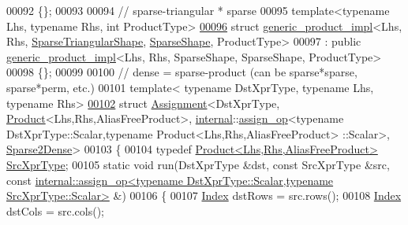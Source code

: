 \begin{DoxyCode}
00092 \{\};
00093 
00094 \textcolor{comment}{// sparse-triangular * sparse}
00095 \textcolor{keyword}{template}<\textcolor{keyword}{typename} Lhs, \textcolor{keyword}{typename} Rhs, \textcolor{keywordtype}{int} ProductType>
\hyperlink{struct_eigen_1_1internal_1_1generic__product__impl_3_01_lhs_00_01_rhs_00_01_sparse_triangular_sh3486abfb0e2b8914c411a6ff792a44dd}{00096} \textcolor{keyword}{struct }\hyperlink{struct_eigen_1_1internal_1_1generic__product__impl}{generic\_product\_impl}<Lhs, Rhs, \hyperlink{struct_eigen_1_1internal_1_1_sparse_triangular_shape}{SparseTriangularShape}, 
      \hyperlink{struct_eigen_1_1_sparse_shape}{SparseShape}, ProductType>
00097  : \textcolor{keyword}{public} \hyperlink{struct_eigen_1_1internal_1_1generic__product__impl}{generic\_product\_impl}<Lhs, Rhs, SparseShape, SparseShape, ProductType>
00098 \{\};
00099 
00100 \textcolor{comment}{// dense = sparse-product (can be sparse*sparse, sparse*perm, etc.)}
00101 \textcolor{keyword}{template}< \textcolor{keyword}{typename} DstXprType, \textcolor{keyword}{typename} Lhs, \textcolor{keyword}{typename} Rhs>
\hyperlink{struct_eigen_1_1internal_1_1_assignment_3_01_dst_xpr_type_00_01_product_3_01_lhs_00_01_rhs_00_01c841c32521f12d3d43fe6d566cc4cbd8}{00102} \textcolor{keyword}{struct }\hyperlink{struct_eigen_1_1internal_1_1_assignment}{Assignment}<DstXprType, \hyperlink{group___core___module_class_eigen_1_1_product}{Product}<Lhs,Rhs,AliasFreeProduct>, 
      \hyperlink{namespaceinternal}{internal}::\hyperlink{struct_eigen_1_1internal_1_1assign__op}{assign\_op}<typename DstXprType::Scalar,typename Product<Lhs,Rhs,AliasFreeProduct>
      ::Scalar>, \hyperlink{struct_eigen_1_1internal_1_1_sparse2_dense}{Sparse2Dense}>
00103 \{
00104   \textcolor{keyword}{typedef} \hyperlink{group___core___module_class_eigen_1_1_product}{Product<Lhs,Rhs,AliasFreeProduct>} 
      \hyperlink{group___core___module_class_eigen_1_1_product}{SrcXprType};
00105   \textcolor{keyword}{static} \textcolor{keywordtype}{void} run(DstXprType &dst, \textcolor{keyword}{const} SrcXprType &src, \textcolor{keyword}{const} 
      \hyperlink{struct_eigen_1_1internal_1_1assign__op}{internal::assign\_op<typename DstXprType::Scalar,typename SrcXprType::Scalar>}
       &)
00106   \{
00107     \hyperlink{namespace_eigen_a62e77e0933482dafde8fe197d9a2cfde}{Index} dstRows = src.rows();
00108     \hyperlink{namespace_eigen_a62e77e0933482dafde8fe197d9a2cfde}{Index} dstCols = src.cols();

\end{DoxyCode}
